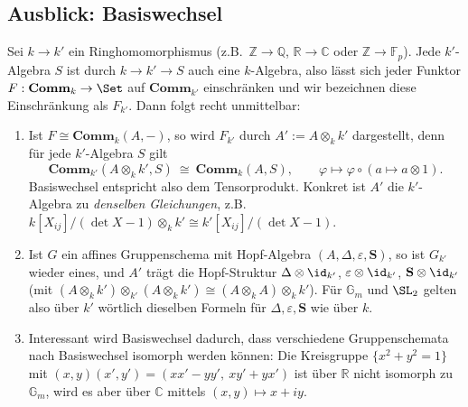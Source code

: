 \documentclass[11pt]{article}
\newcommand{\Comm}{\mathbf{Comm}}
\newcommand{\Sbold}{\mathbf{S}}
\begin{document}
\subsection{Ausblick: Basiswechsel}
    Sei $k\to k'$ ein Ringhomomorphismus (z.B.\ $\mathbb{Z}\to\mathbb{Q}$, $\mathbb{R}\to\mathbb{C}$ oder $\mathbb{Z}\to\mathbb{F}_p$).
    Jede $k'$-Algebra $S$ ist durch $k\to k'\to S$ auch eine $k$-Algebra, also lässt sich jeder Funktor $F:\Comm_k\to\Set$
    auf $\Comm_{k'}$ einschränken und wir bezeichnen diese Einschränkung als $F_{k'}$. Dann folgt recht unmittelbar:
    \begin{enumerate}[label=--]
        \item Ist $F\cong\Comm_k(A,-)$, so wird $F_{k'}$ durch $A' := A\otimes_k k'$ dargestellt, denn für jede $k'$-Algebra $S$ gilt
              $$\Comm_{k'}(A\otimes_k k', S)\ \cong\ \Comm_k(A,S),\qquad \varphi\mapsto \varphi\circ(a\mapsto a\otimes 1).$$
              Basiswechsel entspricht also dem Tensorprodukt. Konkret ist $A'$ die $k'$-Algebra zu \emph{denselben Gleichungen}, z.B.\
              $k[X_{ij}]/(\det X - 1)\otimes_k k' \cong k'[X_{ij}]/(\det X - 1)$.
        \item Ist $G$ ein affines Gruppenschema mit Hopf-Algebra $(A,\Delta,\varepsilon,\Sbold)$, so ist $G_{k'}$ wieder eines, und
              $A'$ trägt die Hopf-Struktur $\Delta\otimes\id_{k'}$, $\varepsilon\otimes\id_{k'}$, $\Sbold\otimes\id_{k'}$
              (mit $(A\otimes_k k')\otimes_{k'}(A\otimes_k k')\cong(A\otimes_k A)\otimes_k k'$).
              Für $\mathbb{G}_m$ und $\SL_2$ gelten also über $k'$ wörtlich dieselben Formeln für $\Delta,\varepsilon,\Sbold$ wie über $k$.
        \item Interessant wird Basiswechsel dadurch, dass verschiedene Gruppenschemata nach Basiswechsel isomorph werden können:
              Die Kreisgruppe $\{x^2+y^2=1\}$ mit $(x,y)(x',y') = (xx'-yy',\ xy'+yx')$ ist über $\mathbb{R}$ nicht isomorph zu
              $\mathbb{G}_m$, wird es aber über $\mathbb{C}$ mittels $(x,y)\mapsto x+iy$.
    \end{enumerate}
\newpage
\end{document}
